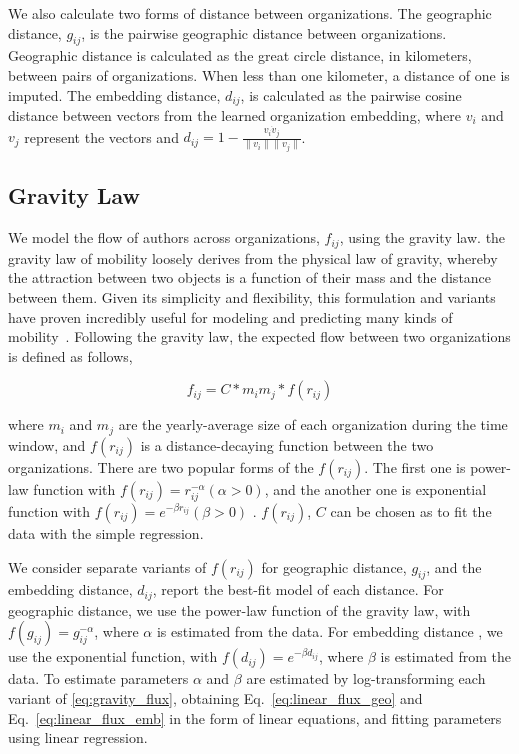\documentclass[12pt]{article} %
\begin{document}
We also calculate two forms of distance between organizations. 
The geographic distance, $g_{ij}$, is the pairwise geographic distance between organizations.
Geographic distance is calculated as the great circle distance, in kilometers, between pairs of organizations. 
When less than one kilometer, a distance of one is imputed. 
The embedding distance, $d_{ij}$, is calculated as the pairwise cosine distance between vectors from the learned organization embedding, where $v_{i}$ and $v_{j}$ represent the vectors and $d_{ij} = 1 - \frac{v_{i} \dot v_{j}}{\lVert v_{i} \rVert \lVert v_{j} \rVert}$.

%
%
\subsection{Gravity Law}

We model the flow of authors across organizations, $f_{ij}$, using the gravity law. 
the gravity law of mobility loosely derives from the physical law of gravity, whereby the attraction between two objects is a function of their mass and the distance between them.
Given its simplicity and flexibility, this formulation and variants have proven incredibly useful for modeling and predicting many kinds of mobility~\autocite{jung2008highwaygravity, curiel2018citygravity, lewer2008immigrationgravity, xia2005measlesgravity, truscott2012epidemicgravity, hong2016busgravity}.
Following the gravity law, the expected flow between two organizations is defined as follows,

\begin{equation}
	\label{eq:gravity_basic}
	f_{ij} = C*m_{i}m_{j}*f(r_{ij})
\end{equation}

where $m_{i}$ and $m_{j}$ are the yearly-average size of each organization during the time window, and $f(r_{ij})$ is a distance-decaying function  between the two organizations. There are two popular forms of the $f(r_{ij})$. The first one is power-law function with $f(r_{ij})= r^{-\alpha}_{ij}  (\alpha > 0)$, and the another one is exponential function with $f(r_{ij}) = e^{-\beta r_{ij}} (\beta > 0)$ \autocite{chen2015distance}.  $f(r_{ij})$, $C$ can be chosen as to fit the data with the simple regression.

We consider separate variants of $f(r_{ij})$ for geographic distance, $g_{ij}$, and the embedding distance, $d_{ij}$, report the best-fit model of each distance.
For geographic distance, we use the power-law function of the gravity law, with $f(g_{ij})= g^{-\alpha}_{ij}$, where $\alpha$ is estimated from the data. 
For embedding distance , we use the exponential function, with $f(d_{ij}) = e^{-\beta d_{ij}}$, where $\beta$ is estimated from the data. 
To estimate parameters $\alpha$ and $\beta$ are estimated by log-transforming each variant of \ref{eq:gravity_flux}, obtaining Eq.~\ref{eq:linear_flux_geo} and Eq.~\ref{eq:linear_flux_emb} in the form of linear equations, and fitting parameters using linear regression. 
\end{document}
